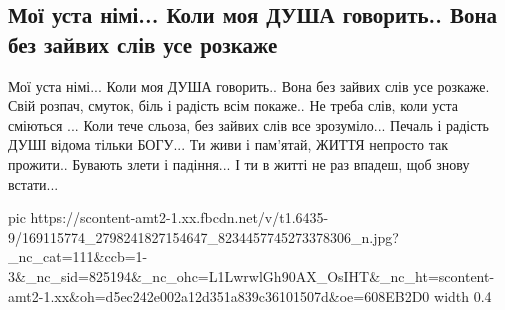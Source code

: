 
 
 
 
 

\subsection{Мої уста німі... Коли моя ДУША говорить.. Вона без зайвих слів усе розкаже}

Мої уста німі... 
Коли моя ДУША говорить..
Вона без зайвих слів 
усе  розкаже.
Свій розпач, смуток, 
біль і радість всім покаже..
Не треба слів, 
коли уста сміються ...
Коли тече сльоза,
без зайвих слів все зрозуміло...
Печаль і радість ДУШІ
відома тільки БОГУ...
Ти живи і пам'ятай,
ЖИТТЯ непросто так прожити..
Бувають злети і падіння...
І ти в житті не раз впадеш,
щоб знову встати...

\ifcmt
  pic https://scontent-amt2-1.xx.fbcdn.net/v/t1.6435-9/169115774_2798241827154647_8234457745273378306_n.jpg?_nc_cat=111&ccb=1-3&_nc_sid=825194&_nc_ohc=L1LwrwlGh90AX_OsIHT&_nc_ht=scontent-amt2-1.xx&oh=d5ec242e002a12d351a839c36101507d&oe=608EB2D0
  width 0.4
\fi

